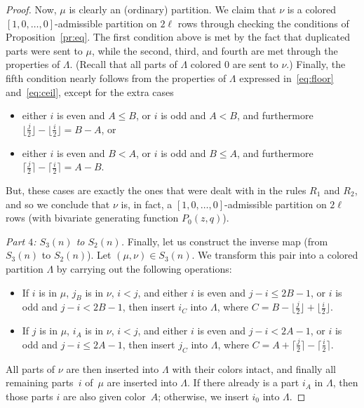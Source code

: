 \documentclass[10pt,a4paper]{amsart}
\numberwithin{equation}{section}
\theoremstyle{definition}
\begin{document}
\begin{proof}
Now, $\mu$ is clearly an (ordinary) partition. We claim that $\nu$ is a colored $[1,0,\dots,0]$-admissible partition on $2\ell$ rows through checking the conditions of Proposition~\ref{pr:eq}. The first condition above is met by the fact that duplicated parts were sent to $\mu$, while the second, third, and fourth are met through the properties of $\Lambda$. (Recall that all parts of $\Lambda$ colored 0 are sent to $\nu$.) Finally, the fifth condition nearly follows from the properties of $\Lambda$ expressed in~\eqref{eq:floor} and~\eqref{eq:ceil}, except for the extra cases
\begin{itemize}\itemsep=0pt
\item either $i$ is even and $A \le B$, or $i$ is odd and $A < B$, and furthermore $ \bigl\lfloor\frac j2\bigr\rfloor-\bigl\lfloor\frac i2\bigr\rfloor= B-A$, or
\item either $i$ is even and $B< A$, or $i$ is odd and $B\le A$, and furthermore
$\bigl\lceil\frac j2\bigr\rceil-\bigl\lceil\frac i2\bigr\rceil= A-B$.
\end{itemize}
But, these cases are exactly the ones that were dealt with in the rules $R_1$ and $R_2$, and so we conclude that $\nu$ is, in fact, a $[1,0,\dots,0]$-admissible partition on $2\ell$ rows (with bivariate generating function $P_0(z,q)$).

{\it Part $4$: $S_3(n)$ to $S_2(n)$.} Finally, let us construct the inverse map (from $S_3(n)$ to $S_2(n)$). Let $(\mu,\nu) \in S_3(n)$. We transform this pair into a colored partition $\Lambda$ by carrying out the following operations:
\begin{itemize}\itemsep=0pt
\item[$(R_1')$] If $i$ is in $\mu$, $j_B$ is in $\nu$, $i<j$, and either $i$ is even and $j-i\le2B-1$, or $i$ is odd and $j-i<2B-1$, then insert $i_C$ into $\Lambda$, where $C=B-\bigl\lfloor\frac j2\bigr\rfloor+\bigl\lfloor\frac i2\bigr\rfloor$.
\item[$(R_2')$] If $j$ is in $\mu$, $i_A$ is in $\nu$, $i<j$, and either $i$ is even and $j-i<2A-1$, or $i$ is odd and $j-i\le 2A-1$, then insert $j_C$ into $\Lambda$, where $ C=A+\bigl\lceil\frac j2\bigr\rceil-\bigl\lceil\frac i2\bigr\rceil$.
\end{itemize}
All parts of $\nu$ are then inserted into $\Lambda$ with their colors intact, and finally all remaining parts~$i$ of~$\mu$ are inserted into $\Lambda$. If there already is a part $i_A$ in $\Lambda$, then those parts $i$ are also given color~$A$; otherwise, we insert $i_0$ into $\Lambda$.


\end{proof}
\end{document}
